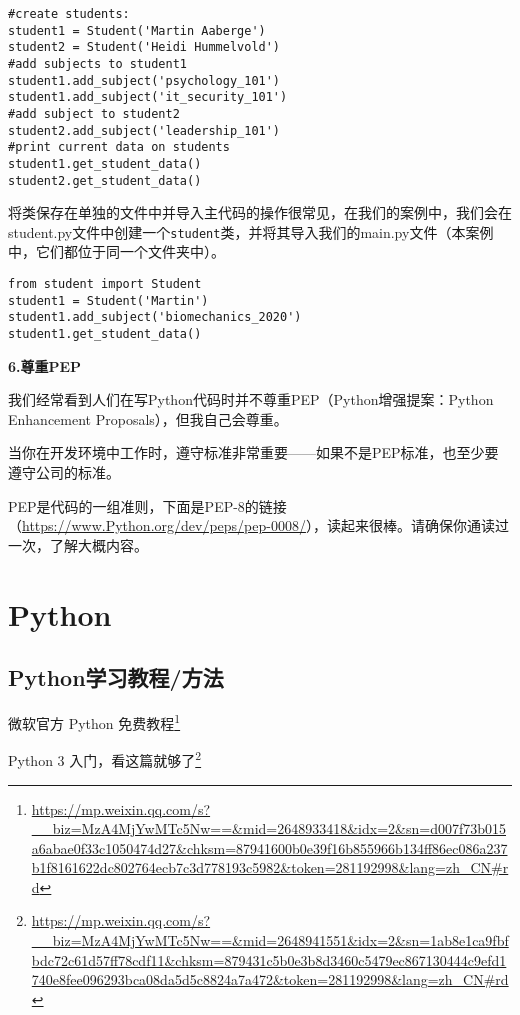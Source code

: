 \documentclass[]{ctexbook}
\renewcommand{\href}[2]{#2\footnote{\url{#1}}}
\begin{document}
\begin{verbatim}
#create students:
student1 = Student('Martin Aaberge')
student2 = Student('Heidi Hummelvold')
#add subjects to student1
student1.add_subject('psychology_101')
student1.add_subject('it_security_101')
#add subject to student2
student2.add_subject('leadership_101')
#print current data on students
student1.get_student_data()
student2.get_student_data()
\end{verbatim}

将类保存在单独的文件中并导入主代码的操作很常见，在我们的案例中，我们会在student.py文件中创建一个\texttt{student}类，并将其导入我们的main.py文件（本案例中，它们都位于同一个文件夹中）。

\begin{verbatim}
from student import Student
student1 = Student('Martin')
student1.add_subject('biomechanics_2020')
student1.get_student_data()
\end{verbatim}

\textbf{6.尊重PEP}

我们经常看到人们在写Python代码时并不尊重PEP（Python增强提案：Python Enhancement Proposals），但我自己会尊重。

当你在开发环境中工作时，遵守标准非常重要------如果不是PEP标准，也至少要遵守公司的标准。

PEP是代码的一组准则，下面是PEP-8的链接（\url{https://www.Python.org/dev/peps/pep-0008/}），读起来很棒。请确保你通读过一次，了解大概内容。

\hypertarget{python-1}{%
\section{Python}\label{python-1}}

\hypertarget{pythonux5b66ux4e60ux6559ux7a0bux65b9ux6cd5}{%
\subsection{Python学习教程/方法}\label{pythonux5b66ux4e60ux6559ux7a0bux65b9ux6cd5}}

\href{https://mp.weixin.qq.com/s?__biz=MzA4MjYwMTc5Nw==\&mid=2648933418\&idx=2\&sn=d007f73b015a6abae0f33c1050474d27\&chksm=87941600b0e39f16b855966b134ff86ec086a237b1f8161622dc802764ecb7c3d778193c5982\&token=281192998\&lang=zh_CN\#rd}{微软官方 Python 免费教程}

\href{https://mp.weixin.qq.com/s?__biz=MzA4MjYwMTc5Nw==\&mid=2648941551\&idx=2\&sn=1ab8e1ca9fbfbdc72c61d57ff78cdf11\&chksm=879431c5b0e3b8d3460c5479ec867130444c9efd1740e8fee096293bca08da5d5c8824a7a472\&token=281192998\&lang=zh_CN\#rd}{Python 3 入门，看这篇就够了}
\end{document}
